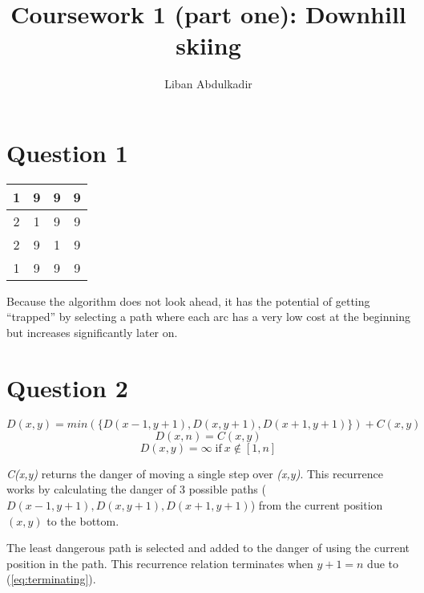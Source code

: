 \documentclass{article}
\begin{document}
\title{Coursework 1 (part one): Downhill skiing}
\author{Liban Abdulkadir}

\maketitle

\section*{Question 1}
\begin{center}
    \begin{tabular}{| c | c | c | c | }
    \hline
    1 & 9 & 9 & 9 \\ \hline
    2 & 1 & 9 & 9 \\ \hline
    2 & 9 & 1 & 9 \\ \hline
    1 & 9 & 9 & 9 \\ \hline
    \end{tabular}
\end{center}
Because the algorithm does not look ahead, it has the potential of getting “trapped” by selecting a path where each arc has a very low cost at the beginning but increases significantly later on.
\section*{Question 2}
\begin{equation}D(x,y) = min(\{D(x-1,y+1),D(x,y+1),D(x+1,y+1)\}) + C(x,y)\end{equation}
\begin{equation}D(x,n) = C(x,y)\label{eq:terminating}\end{equation}
\begin{equation}D(x,y) = \infty\;\text{if}\: x \notin [1,n]\end{equation}

\emph{C(x,y)} returns the danger of moving a single step over \emph{(x,y)}.
This recurrence works by calculating the danger of 3 possible paths 
(\begin{math}D(x-1,y+1), D(x,y+1), D(x+1,y+1)\end{math}) from the current position 
\begin{math}(x,y)\end{math} to the bottom.

The least dangerous path is selected and added to the danger of using the current position in the path.
This recurrence relation terminates when \begin{math}y+1 = n\end{math} due to (\ref{eq:terminating}).
\end{document}

